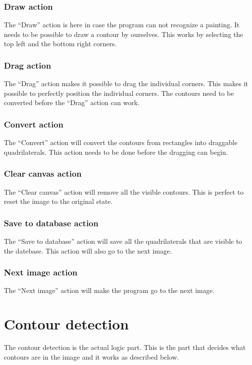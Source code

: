 \subsubsection{Draw action}
The ``Draw'' action is here in case the program can not recognize a painting. It needs to be possible to draw a contour by ourselves. This works by selecting the top left and the bottom right corners.

\subsubsection{Drag action}
The ``Drag'' action makes it possible to drag the individual corners. This makes it possible to perfectly position the individual corners. The contours need to be converted before the ``Drag'' action can work.

\subsubsection{Convert action}
The ``Convert'' action will convert the contours from rectangles into draggable quadrilaterals. This action needs to be done before the dragging can begin.


\subsubsection{Clear canvas action}
The ``Clear canvas'' action will remove all the visible contours. This is perfect to reset the image to the original state.

\subsubsection{Save to database action}
The ``Save to database'' action will save all the quadrilaterals that are visible to the datebase. This action will also go to the next image.

\subsubsection{Next image action}
The ``Next image'' action will make the program go to the next image.

\section{Contour detection}
\label{sec:contour_detection}
The contour detection is the actual logic part. This is the part that decides what contours are in the image and it works as described below.

